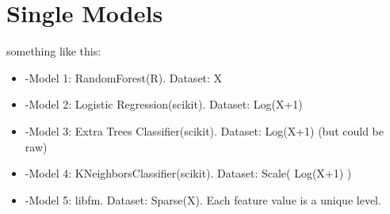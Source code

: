 \section{Single Models}
something like this:
\begin{itemize}
  \item -Model 1: RandomForest(R). Dataset: X
  \item -Model 2: Logistic Regression(scikit). Dataset: Log(X+1)
  \item -Model 3: Extra Trees Classifier(scikit). Dataset: Log(X+1) (but could be raw)
  \item -Model 4: KNeighborsClassifier(scikit). Dataset: Scale( Log(X+1) )
  \item -Model 5: libfm. Dataset: Sparse(X). Each feature value is a unique level.
\end{itemize}

